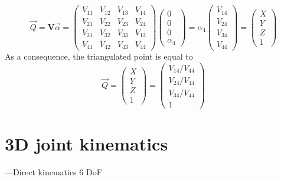 \begin{algorithm}
\begin{algorithmic}[1]
\begin{equation}
          \overrightarrow{Q} = 
          \textbf{V} \overrightarrow{\alpha} 
          = \begin{pmatrix}V_{11} & V_{12} & V_{13} & V_{14} \\
          V_{21} & V_{22} & V_{23} & V_{24} \\
          V_{31} & V_{32} & V_{33} & V_{13} \\
          V_{41} & V_{42} & V_{43} & V_{44}\end{pmatrix} \begin{pmatrix}0 \\0 \\0 \\\alpha_4\end{pmatrix} 
          = \alpha_4 \begin{pmatrix}V_{14} \\V_{24} \\V_{34} \\V_{44}\end{pmatrix} 
          = \begin{pmatrix}X \\Y \\Z \\1\end{pmatrix}
      \end{equation} 
      \STATE As a consequence, the triangulated point is equal to
      \begin{equation}
          \overrightarrow{Q}=\begin{pmatrix}X \\Y \\Z \\1\end{pmatrix} = \begin{pmatrix}V_{14}/V_{44} \\V_{24}/V_{44} \\V_{34}/V_{44} \\1\end{pmatrix}
      \end{equation}
      \end{algorithmic}
\end{algorithm}



\FloatBarrier
\section{3D joint kinematics}\label{sec:3D joint kin}


---Direct kinematics
6 DoF 

